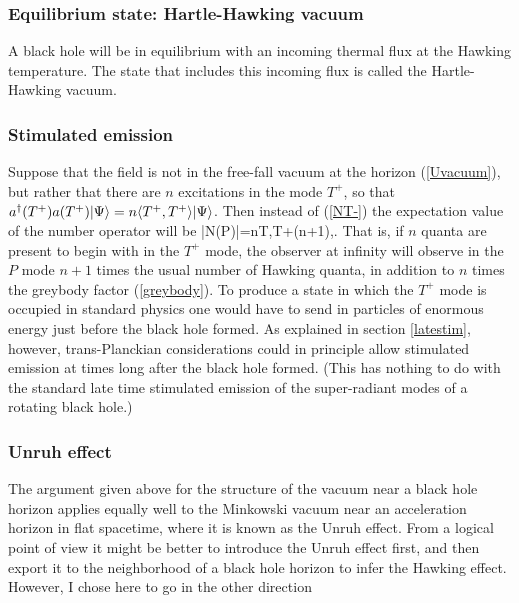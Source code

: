 \documentclass[12pt]{article}
\begin{document}
\subsubsection{Equilibrium state: Hartle-Hawking vacuum}

A black hole will be in equilibrium with an incoming thermal flux
at the Hawking temperature. The state that includes this incoming flux is called the Hartle-Hawking vacuum.

\subsubsection{Stimulated emission}
\label{stim}

Suppose that the field is not
in the free-fall vacuum at the horizon 
(\ref{Uvacuum}), but rather
that there are $n$ excitations in the mode $T^+$,
so that $a^\dagger(T^+)a(T^+)|\Psi\rangle=n\langle T^+,T^+\rangle|\Psi\rangle$.
Then instead of (\ref{NT-}) the expectation value of the 
number operator will be 
\beq
\la\Psi|N(P)|\Psi\ra=n\la T,T\ra+(n+1)\la{},\ra.
\label{Nstim}
\eeq
That is, if $n$ quanta are present to begin with 
in the $T^+$ mode, the observer at infinity will observe
in the $P$ mode $n+1$ times the usual number of 
Hawking quanta, in addition to $n$ times the greybody factor
(\ref{greybody}).
To produce a state in which the $T^+$ mode is occupied 
in standard physics
one would have to send in particles of enormous energy just
before the black hole formed\cite{Wald:ka}. As explained
in section \ref{latestim}, however, 
trans-Planckian considerations could in principle
allow stimulated emission
at times long after the black
hole formed. (This has nothing to do with the standard
late time stimulated emission of the super-radiant 
modes of a rotating black 
hole\cite{Bekenstein:mv,Panangaden:pc}.)

\subsubsection{Unruh effect}
\label{Unruheffect}

The argument given above for the structure of the vacuum
near a black hole horizon
applies equally well to the Minkowski vacuum near an
acceleration horizon in flat spacetime, 
where it is known as the Unruh effect. 
From a logical point of view it might be better
to introduce the Unruh effect first, and then 
export it to the neighborhood of a black hole horizon 
to infer the Hawking effect. However, 
I chose here to go in the other direction
\end{document}
